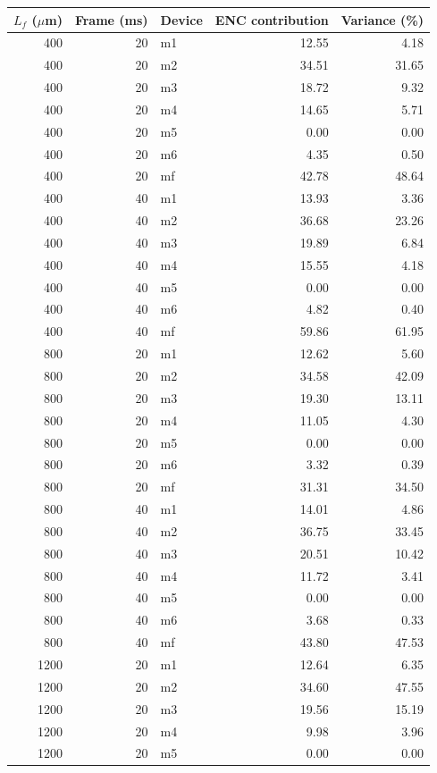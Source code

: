 \documentclass[10pt,a4paper]{article}
\begin{document}
\begin{center}\scriptsize\begin{longtable}{rrlrr}\toprule
$L_f$ ($\mu$m) & Frame (ms) & Device & ENC contribution & Variance (\%)\\\midrule
400 & 20 & m1 & 12.55 & 4.18 \\
400 & 20 & m2 & 34.51 & 31.65 \\
400 & 20 & m3 & 18.72 & 9.32 \\
400 & 20 & m4 & 14.65 & 5.71 \\
400 & 20 & m5 & 0.00 & 0.00 \\
400 & 20 & m6 & 4.35 & 0.50 \\
400 & 20 & mf & 42.78 & 48.64 \\
400 & 40 & m1 & 13.93 & 3.36 \\
400 & 40 & m2 & 36.68 & 23.26 \\
400 & 40 & m3 & 19.89 & 6.84 \\
400 & 40 & m4 & 15.55 & 4.18 \\
400 & 40 & m5 & 0.00 & 0.00 \\
400 & 40 & m6 & 4.82 & 0.40 \\
400 & 40 & mf & 59.86 & 61.95 \\
800 & 20 & m1 & 12.62 & 5.60 \\
800 & 20 & m2 & 34.58 & 42.09 \\
800 & 20 & m3 & 19.30 & 13.11 \\
800 & 20 & m4 & 11.05 & 4.30 \\
800 & 20 & m5 & 0.00 & 0.00 \\
800 & 20 & m6 & 3.32 & 0.39 \\
800 & 20 & mf & 31.31 & 34.50 \\
800 & 40 & m1 & 14.01 & 4.86 \\
800 & 40 & m2 & 36.75 & 33.45 \\
800 & 40 & m3 & 20.51 & 10.42 \\
800 & 40 & m4 & 11.72 & 3.41 \\
800 & 40 & m5 & 0.00 & 0.00 \\
800 & 40 & m6 & 3.68 & 0.33 \\
800 & 40 & mf & 43.80 & 47.53 \\
1200 & 20 & m1 & 12.64 & 6.35 \\
1200 & 20 & m2 & 34.60 & 47.55 \\
1200 & 20 & m3 & 19.56 & 15.19 \\
1200 & 20 & m4 & 9.98 & 3.96 \\
1200 & 20 & m5 & 0.00 & 0.00 \\

\end{longtable}
\end{center}
\end{document}
